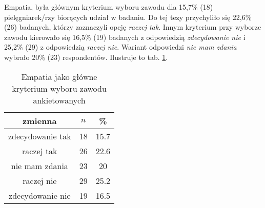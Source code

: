 



Empatia, była głównym kryterium wyboru zawodu dla 15,7\% (18) pielęgniarek/rzy biorących udział w badaniu. Do tej tezy przychyliło się 22,6\% (26) badanych, którzy zaznaczyli opcję \textit{raczej tak}. Innym kryterium przy wyborze zawodu kierowało się 16,5\% (19) badanych z odpowiedzią \textit{zdecydowanie nie} i 25,2\% (29) z odpowiedzią \textit{raczej nie}. Wariant odpowiedzi \textit{nie mam zdania} wybrało 20\% (23) respondentów. Ilustruje to tab. \ref{tab:Q34}.






\begin{table}[H]
\caption{Empatia jako główne kryterium wyboru zawodu ankietowanych}
\centering
\begin{tabular}{ | c | c | c |}
\hline
zmienna & $n$ & \% \\
\hline
zdecydowanie tak  &  18  & 15.7 \\
\hline
raczej tak  &  26  & 22.6 \\
\hline
nie mam zdania  &  23  & 20 \\
\hline
raczej nie  &  29  & 25.2 \\
\hline
zdecydowanie nie  &  19  & 16.5 \\
\hline
\end{tabular}
\label{tab:Q34}
\end{table}
